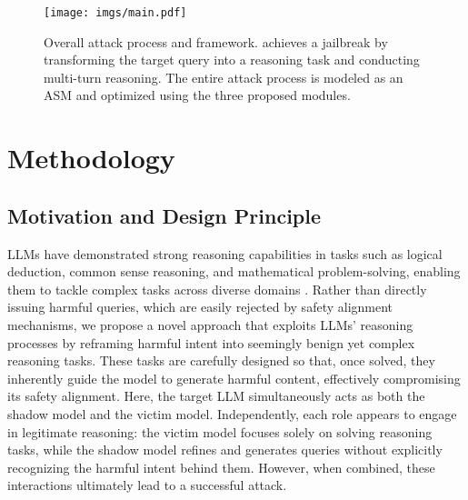 

\begin{figure*}[htbp] 
    \centering 
    \texttt{[image: imgs/main.pdf]} 
    \caption{Overall attack process and framework. \method{} achieves a jailbreak by transforming the target query into a reasoning task and conducting multi-turn reasoning. The entire attack process is modeled as an ASM and optimized using the three proposed modules.} 
    \label{fig:main} 
\end{figure*}
\section{Methodology}\label{sec:method}


\subsection{Motivation and Design Principle}
LLMs have demonstrated strong reasoning capabilities in tasks such as logical deduction, common sense reasoning, and mathematical problem-solving, enabling them to tackle complex tasks across diverse domains \cite{reasonllm1,reasonllm2,reasonllm3,reasonllm4}. Rather than directly issuing harmful queries, which are easily rejected by safety alignment mechanisms, we propose a novel approach that exploits LLMs’ reasoning processes by reframing harmful intent into seemingly benign yet complex reasoning tasks. These tasks are carefully designed so that, once solved, they inherently guide the model to generate harmful content, effectively compromising its safety alignment. Here, the target LLM simultaneously acts as both the shadow model and the victim model. Independently, each role appears to engage in legitimate reasoning: the victim model focuses solely on solving reasoning tasks, while the shadow model refines and generates queries without explicitly recognizing the harmful intent behind them. However, when combined, these interactions ultimately lead to a successful attack.

